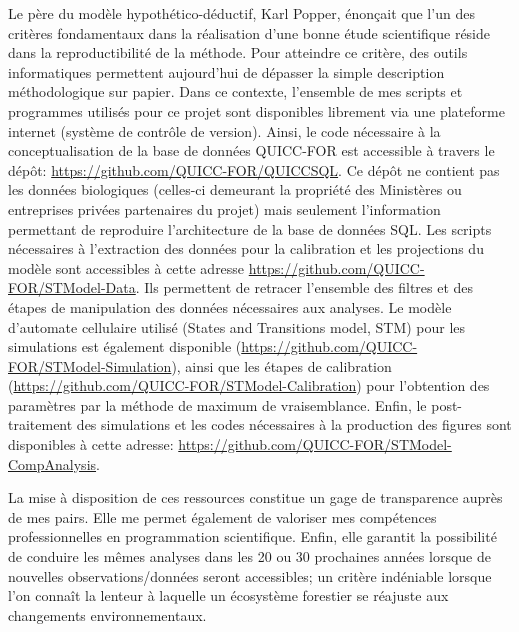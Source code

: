 Le père du modèle hypothético-déductif, Karl Popper, énonçait que l'un des critères fondamentaux
dans la réalisation d'une bonne étude scientifique réside dans la reproductibilité de la méthode.
Pour atteindre ce critère, des outils informatiques permettent aujourd'hui de dépasser la simple
description méthodologique sur papier. Dans ce contexte, l'ensemble de mes scripts et programmes
utilisés pour ce projet sont disponibles librement via une plateforme internet
(système de contrôle de version). Ainsi, le code nécessaire à la conceptualisation de la base de
données QUICC-FOR est accessible à travers le dépôt: \url{https://github.com/QUICC-FOR/QUICCSQL}. Ce
dépôt ne contient pas les données biologiques (celles-ci demeurant la propriété des Ministères ou
entreprises privées partenaires du projet) mais seulement l'information permettant de reproduire
l'architecture de la base de données SQL. Les scripts nécessaires à l'extraction des données pour la
calibration et les projections du modèle sont accessibles à cette adresse
\url{https://github.com/QUICC-FOR/STModel-Data}. Ils permettent de retracer l'ensemble des filtres
et des étapes de manipulation des données nécessaires aux analyses. Le modèle
d'automate cellulaire utilisé (States and Transitions model, STM) pour les simulations est également
disponible (\url{https://github.com/QUICC-FOR/STModel-Simulation}), ainsi que les étapes de
calibration (\url{https://github.com/QUICC-FOR/STModel-Calibration}) pour l'obtention des paramètres
par la méthode de maximum de vraisemblance. Enfin, le post-traitement des simulations et les codes
nécessaires à la production des figures sont disponibles à cette adresse:
\url{https://github.com/QUICC-FOR/STModel-CompAnalysis}.

La mise à disposition de ces ressources constitue un gage de transparence auprès de mes pairs. Elle
me permet également de valoriser mes compétences professionnelles en programmation scientifique.
Enfin, elle garantit la possibilité de conduire les mêmes analyses dans les 20 ou 30 prochaines
années lorsque de nouvelles observations/données seront accessibles; un critère indéniable lorsque
l'on connaît la lenteur à laquelle un écosystème forestier se réajuste aux changements
environnementaux.



